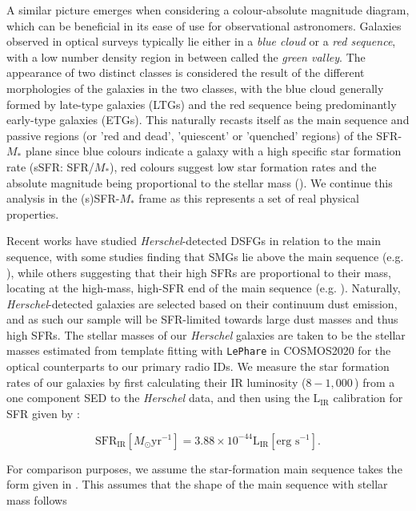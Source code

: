 A similar picture emerges when considering a colour-absolute magnitude diagram, which can be beneficial in its ease of use for observational astronomers. Galaxies observed in  optical surveys typically lie either in a \textit{blue cloud} or a \textit{red sequence}, with a low number density region in between called the \textit{green valley}. The appearance of two distinct classes is considered the result of the different morphologies of the galaxies in the two classes, with the blue cloud generally formed by late-type galaxies (LTGs) and the red sequence being predominantly early-type galaxies (ETGs). This naturally recasts itself as the main sequence and passive regions (or 'red and dead', 'quiescent' or 'quenched' regions) of the SFR-$M_*$ plane since blue colours indicate a galaxy with a high specific star formation rate (sSFR: SFR/$M_*$), red colours suggest low star formation rates and the absolute magnitude being proportional to the stellar mass (\citealt{Eales_2018}). We continue this analysis in the (s)SFR-$M_*$ frame as this represents a set of real physical properties.

Recent works have studied \textit{Herschel}-detected DSFGs in relation to the main sequence, with some studies finding that SMGs lie above the main sequence (e.g. \citealt{Hainline_2011}), while others suggesting that their high SFRs are proportional to their mass, locating at the high-mass, high-SFR end of the main sequence (e.g. \citealt{Michalowski_2012a}). Naturally, \textit{Herschel}-detected galaxies are selected based on their continuum dust emission, and as such our sample will be SFR-limited towards large dust masses and thus high SFRs. The stellar masses of our \textit{Herschel} galaxies are taken to be the stellar masses estimated from template fitting with \texttt{LePhare} in COSMOS2020 for the optical counterparts to our primary radio IDs. We measure the star formation rates of our galaxies by first calculating their IR luminosity ($8 - 1,000\,$\micron) from a one component SED to the \textit{Herschel} data, and then using the $\textrm{L}_{\textrm{IR}}$ calibration for SFR given by \citealt{Murphy_2011}:

\begin{equation}
	\textrm{SFR}_{\textrm{IR}} [M_\odot\textrm{yr}^{-1}] = 3.88\times10^{-44}\textrm{L}_{\textrm{IR}} [\textrm{erg s}^{-1}].
	\label{eq:LIR_SFR_calibration}
\end{equation}

For comparison purposes, we assume the star-formation main sequence takes the form given in \citealt{Scoville_2017}. This assumes that the shape of the main sequence with stellar mass follows 

